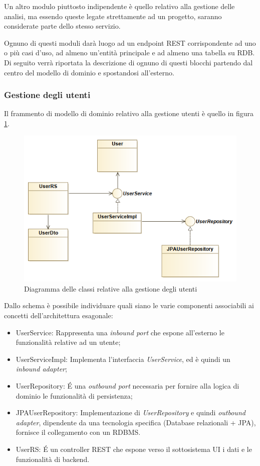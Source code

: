 Un altro modulo piuttosto indipendente è quello relativo alla gestione delle analisi, ma essendo queste legate strettamente ad un progetto, saranno considerate parte dello stesso servizio.

Ognuno di questi moduli darà luogo ad un endpoint REST corrispondente ad uno o più casi d'uso, ad almeno un'entità principale e ad almeno una tabella su RDB.
Di seguito verrà riportata la descrizione di ognuno di questi blocchi partendo dal centro del modello di dominio e spostandosi all'esterno.

\subsubsection{Gestione degli utenti}
Il frammento di modello di dominio relativo alla gestione utenti è quello in figura \ref{fig:users_diagram}.

\begin{figure}[h]
	\centering
	\includegraphics[width=\textwidth]{img/users_diagram}
	\caption{Diagramma delle classi relative alla gestione degli utenti}
	\label{fig:users_diagram}
\end{figure}

Dallo schema è possibile individuare quali siano le varie componenti associabili ai concetti dell'architettura esagonale:
\begin{itemize}
	\item UserService: Rappresenta una \textit{inbound port} che espone all'esterno le funzionalità relative ad un utente;
	\item UserServiceImpl: Implementa l'interfaccia \textit{UserService}, ed è quindi un \textit{inbound adapter};
	\item UserRepository: \'E una \textit{outbound port} necessaria per fornire alla logica di dominio le funzionalità di persistenza;
	\item JPAUserRepository: Implementazione di \textit{UserRepository} e quindi \textit{outbound adapter}, dipendente da una tecnologia specifica (Database relazionali + JPA), fornisce il collegamento con un RDBMS.
	\item UserRS: \'E un controller REST che espone verso il sottosistema UI i dati e le funzionalità di backend.
\end{itemize}

